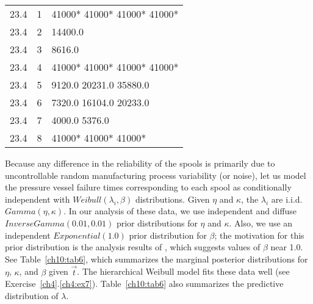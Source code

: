 \documentclass {book}
\begin{document}
\begin{sidebar}
\begin{table}
\begin{tabular}{ccl}
 23.4& 1  &  41000*\hspace{0.02in} 41000*\hspace{0.02in} 41000*\hspace{0.02in} 41000*\\
 23.4& 2  &  14400.0\\
 23.4& 3  &  8616.0\\
 23.4& 4  &  41000*\hspace{0.02in} 41000*\hspace{0.02in} 41000*\hspace{0.02in} 41000*\\
 23.4& 5  &  9120.0\hspace{0.02in} 20231.0\hspace{0.02in} 35880.0\\
 23.4& 6  &  7320.0\hspace{0.02in} 16104.0\hspace{0.02in} 20233.0\\
 23.4& 7  &  4000.0\hspace{0.02in} 5376.0\\
 23.4& 8  &  41000*\hspace{0.02in} 41000*\hspace{0.02in} 41000* \\

\hline
\end{tabular}
\end{table}

Because any difference in the reliability of the spools is
primarily due to uncontrollable random manufacturing process
variability (or noise), let us model the pressure vessel failure times
corresponding to each spool as conditionally independent with
$Weibull(\lambda_i,\beta)$ distributions. Given $\eta$ and
$\kappa$, the $\lambda_i$ are i.i.d.\ $Gamma(\eta, \kappa)$. In
our analysis of these data, we use independent and diffuse
$InverseGamma(0.01, 0.01)$ prior distributions for $\eta$ and
$\kappa$. Also, we use an independent $Exponential(1.0)$ prior
distribution for $\beta$; the motivation for this prior
distribution is the analysis results of \citet{CKSS91}, which
suggests values of $\beta$ near 1.0.  See Table~\ref{ch10:tab6},
which summarizes the marginal posterior distributions for $\eta$,
$\kappa$, and $\beta$ given $\vec{t}$. The hierarchical Weibull
model fits these data well (see Exercise~\ref{ch4}.\ref{ch4:ex7}).
Table~\ref{ch10:tab6} also summarizes the predictive distribution
of $\lambda$.  
 


\end{sidebar}
\end{document}
